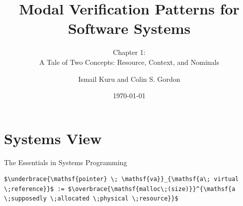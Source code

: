 \documentclass[aspectratio=169,xcolor=dvipsnames]{beamer}
\title{Modal Verification Patterns for Software Systems}
\subtitle{Chapter 1: \\ A Tale of Two Concepts: Resource, Context, and Nominals}
\author{Ismail Kuru and Colin S. Gordon}
\institute
{
    Department of Computer Science \\
    Drexel University %
}
\date{\today} %
\newcommand{\makepart}[1]{ %
\part{#1} \frame{\partpage}
}
\begin{document}
\begin{frame}
    \titlepage
\end{frame}




\makepart{Systems View}
\begin{frame}[fragile]{The Essentials in Systems Programming}
\begin{lstlisting}[style=CStyle,mathescape]
    $\underbrace{\mathsf{pointer} \; \mathsf{va}}_{\mathsf{a\; virtual \;reference}}$ := $\overbrace{\mathsf{malloc\;(size)}}^{\mathsf{a \;supposedly \;allocated \;physical \;resource}}$
\end{lstlisting}
\end{frame}
\end{document}
